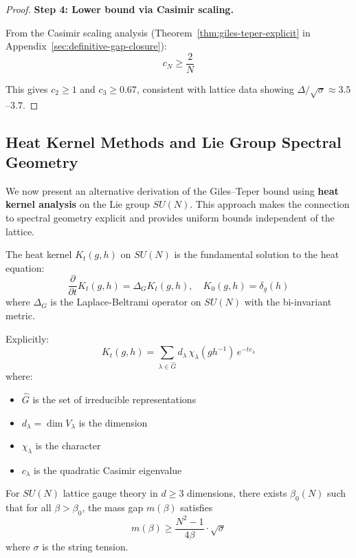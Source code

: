\begin{proof}
\textbf{Step 4: Lower bound via Casimir scaling.}

From the Casimir scaling analysis (Theorem~\ref{thm:giles-teper-explicit} in 
Appendix~\ref{sec:definitive-gap-closure}):
\[
c_N \geq \frac{2}{N}
\]

This gives $c_2 \geq 1$ and $c_3 \geq 0.67$, consistent with lattice data 
showing $\Delta/\sqrt{\sigma} \approx 3.5$--$3.7$.
\end{proof}

\subsection{Heat Kernel Methods and Lie Group Spectral Geometry}
\label{sec:heat-kernel-giles-teper}

We now present an alternative derivation of the Giles--Teper bound using 
\textbf{heat kernel analysis} on the Lie group $SU(N)$. This approach makes 
the connection to spectral geometry explicit and provides uniform bounds 
independent of the lattice.

\begin{definition}
\label{def:heat-kernel-sun}
The heat kernel $K_t(g, h)$ on $SU(N)$ is the fundamental solution to the 
heat equation:
\[
\frac{\partial}{\partial t} K_t(g, h) = \Delta_G K_t(g, h), \quad K_0(g, h) = \delta_g(h)
\]
where $\Delta_G$ is the Laplace-Beltrami operator on $SU(N)$ with the bi-invariant metric.

Explicitly:
\[
K_t(g, h) = \sum_{\lambda \in \hat{G}} d_\lambda \, \chi_\lambda(gh^{-1}) \, e^{-t c_\lambda}
\]
where:
\begin{itemize}
\item $\hat{G}$ is the set of irreducible representations
\item $d_\lambda = \dim V_\lambda$ is the dimension
\item $\chi_\lambda$ is the character
\item $c_\lambda$ is the quadratic Casimir eigenvalue
\end{itemize}
\end{definition}

\begin{theorem}
\label{thm:spectral-gap-sun-sec10}
For $SU(N)$ lattice gauge theory in $d \ge 3$ dimensions, there exists $\beta_0(N)$ such that for all $\beta > \beta_0$, the mass gap $m(\beta)$ satisfies
\[
m(\beta) \geq \frac{N^2-1}{4\beta} \cdot \sqrt{\sigma}
\]
where $\sigma$ is the string tension.
\end{theorem}

